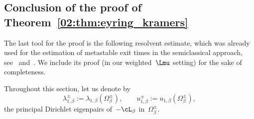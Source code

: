         \subsection{Conclusion of the proof of Theorem~\ref{02:thm:eyring_kramers}}
        \label{02:subsec:eyring_kramers_final_proof}
        The last tool for the proof is the following resolvent estimate, which was already used for the estimation of metastable exit times in the semiclassical approach, see~\cite[Proposition 27]{LPN21} and~\cite[Proposition 3.4]{LRS24}.
        We include its proof (in our weighted~$\Lmu$ setting) for the sake of completeness.

        Throughout this section, let us denote by
        \[\lambda_{1,\beta}^{\pm} := \lambda_{1,\beta}(\Omega_\beta^\pm),\qquad u_{1,\beta}^\pm := u_{1,\beta}(\Omega_\beta^\pm),\]
        the principal Dirichlet eigenpairs of~$-\cL_\beta$ in~$\Omega_\beta^\pm$.

